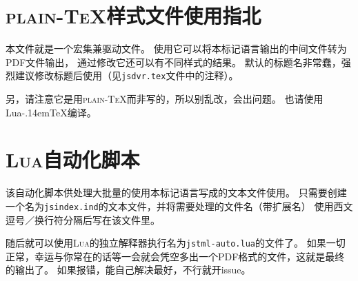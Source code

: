 \documentclass[twoside]{ltjsarticle}
\begin{document}
\section{{\scshape plain-TeX}样式文件使用指北}
本文件就是一个宏集兼驱动文件。
使用它可以将本标记语言输出的中间文件转为PDF文件输出，
通过修改它还可以有不同样式的结果。
默认的标题名非常蠢，强烈建议修改标题后使用（见\texttt{jsdvr.tex}文件中的注释）。\par
另，请注意它是用{\scshape plain-TeX}而非{\LaTeXe}写的，所以别乱改，会出问题。
也请使用{Lua\kern-.14em\TeX}编译。

\section{{\scshape Lua}自动化脚本}
该自动化脚本供处理大批量的使用本标记语言写成的文本文件使用。
只需要创建一个名为\texttt{jsindex.ind}的文本文件，并将需要处理的文件名（带扩展名）
使用西文逗号／换行符分隔后写在该文件里。\par
随后就可以使用{\scshape Lua}的独立解释器执行名为\texttt{jstml-auto.lua}的文件了。
如果一切正常，幸运与你常在的话等一会就会凭空多出一个PDF格式的文件，这就是最终的输出了。
如果报错，能自己解决最好，不行就开issue。
\end{document}
